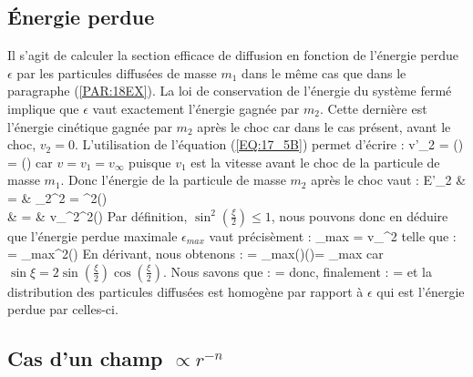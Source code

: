 \subsection{\'Energie perdue}

Il s'agit de calculer la section efficace de diffusion en fonction de l'\'energie perdue $\epsilon$ par les particules diffus\'ees de masse $m_{1}$ dans le m\^eme cas que dans le paragraphe (\ref{PAR:18EX}). La loi de conservation de l'\'energie du syst\`eme ferm\'e implique que $\epsilon$ vaut exactement l'\'energie gagn\'ee par $m_{2}$. Cette derni\`ere est l'\'energie cin\'etique gagn\'ee par $m_{2}$ apr\`es le choc car dans le cas pr\'esent, avant le choc, $v_{2} = 0$. L'utilisation de l'\'equation (\ref{EQ:17_5B}) permet d'\'ecrire :
\be
	v'_{2} = \sin\left(\right) = \sin\left(\right)
\ee
car $v = v_{1} = v_{\infty}$ puisque $v_{1}$ est la vitesse avant le choc de la particule de masse $m_{1}$. Donc l'\'energie de la particule de masse $m_{2}$ apr\`es le choc vaut :
\bea
	E'_{2} & = & _{2}^{2} = \sin^{2}\left(\right) \nonumber \\
	\Leftrightarrow \epsilon & = & v_{\infty}^{2}\sin^{2}\left(\right)
\eea
Par d\'efinition, $\sin^{2}(\frac{\xi}{2}) \leq 1$, nous pouvons donc en d\'eduire que l'\'energie perdue maximale $\epsilon_{max}$ vaut pr\'ecis\`ement :
\be
	\epsilon_{max} = v_{\infty}^{2}
\ee
telle que :
\be
	\epsilon = \epsilon_{max}\sin^{2}\left(\right)
\ee
En d\'erivant, nous obtenons :
\be
	\epsilon = \epsilon_{max}\sin\left(\right)\cos\left(\right)\xi = \epsilon_{max}\sin\xi{}\xi
\ee
car $\sin\xi = 2\sin(\frac{\xi}{2})\cos(\frac{\xi}{2})$. Nous savons que :
\be
	\sigma = \sin\xi{}\xi
\ee
donc, finalement :
\be
	\sigma = \epsilon
\ee
et la distribution des particules diffus\'ees est homog\`ene par rapport \`a $\epsilon$ qui est l'\'energie perdue par celles-ci.

\subsection{Cas d'un champ $\propto r^{-n}$}

